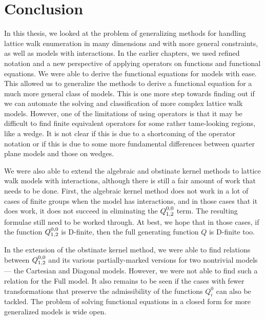 
\chapter{Conclusion}
\label{ch:Conclusion}

In this thesis, we looked at the problem of generalizing methods for handling lattice walk enumeration in many dimensions and with more general constraints, as well as models with interactions. In the earlier chapters, we used refined notation and a new perspective of applying operators on functions and functional equations. We were able to derive the functional equations for \classic \dD models with ease. This allowed us to generalize the methods to derive a functional equation for a much more general class of models. This is one more step towards finding out if we can automate the solving and classification of more complex lattice walk models. However, one of the limitations of using operators is that it may be difficult to find finite equivalent operators for some rather tame-looking regions, like a wedge. It is not clear if this is due to a shortcoming of the operator notation or if this is due to some more fundamental differences between quarter plane models and those on wedges.

We were also able to extend the algebraic and obstinate kernel methods to lattice walk models with interactions, although there is still a fair amount of work that needs to be done. First, the algebraic kernel method does not work in a lot of cases of finite groups when the model has interactions, and in those cases that it does work, it does not succeed in eliminating the $Q_{1,2}^{0,0}$ term. The resulting formulae still need to be worked through. At best, we hope that in those cases, if the function $Q_{1,2}^{0,0}$ is D-finite, then the full generating function $Q$ is D-finite too. 

In the extension of the obstinate kernel method, we were able to find relations between $Q_{1,2}^{0,0}$ and its various partially-marked versions for two nontrivial models --- the Cartesian and Diagonal models. However, we were not able to find such a relation for the Full model. It also remains to be seen if the cases with fewer transformations that preserve the admissibility of the functions $Q_i^0$ can also be tackled. The problem of solving functional equations in a closed form for more generalized models is wide open.

